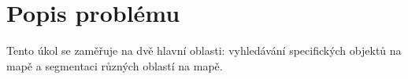 \section{Popis problému}

Tento úkol se zaměřuje na dvě hlavní oblasti: vyhledávání specifických objektů na mapě a segmentaci různých oblastí na mapě.





